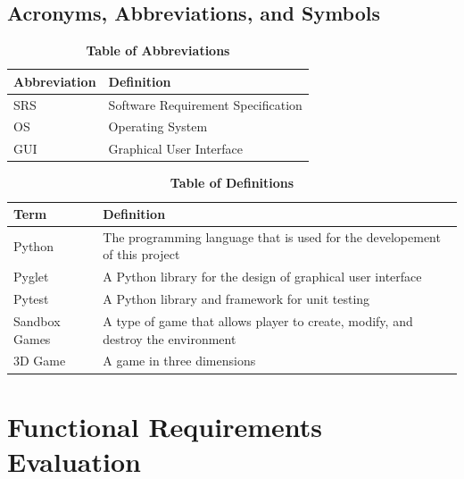 \documentclass[12pt, titlepage]{article}
\begin{document}
\subsection{Acronyms, Abbreviations, and Symbols}
\FloatBarrier
\begin{table}[hbp]
\begin{tabularx}{\textwidth}{p{3cm}X}
\toprule
\textbf{Abbreviation} & \textbf{Definition} \\
\midrule
SRS & Software Requirement Specification\\
OS & Operating System\\
GUI & Graphical User Interface\\
\bottomrule
\end{tabularx}
\caption{\textbf{Table of Abbreviations}} \label{Table}
\end{table}
\FloatBarrier
\FloatBarrier
\begin{table}[!htbp]

\begin{tabularx}{\textwidth}{p{3cm}X}
\toprule
\textbf{Term} & \textbf{Definition}\\
\midrule
Python & The programming language that is used for the developement of this project\\
Pyglet & A Python library for the design of graphical user interface\\
Pytest & A Python library and framework for unit testing\\
Sandbox Games & A type of game that allows player to create, modify, and destroy the environment\\
3D Game & A game in three dimensions\\

\bottomrule
\end{tabularx}
\caption{\textbf{Table of Definitions}} \label{Table}
\end{table}
\FloatBarrier


\newpage
\section{Functional Requirements Evaluation}
\end{document}
